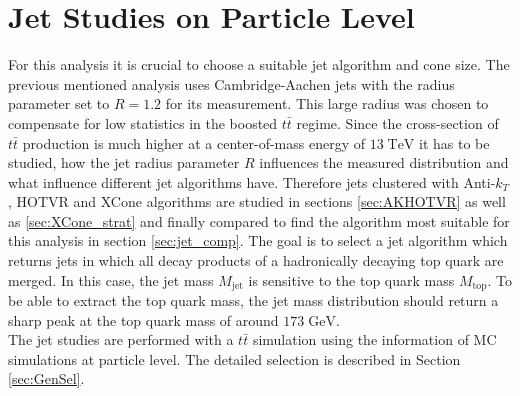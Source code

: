 \section{Jet Studies on Particle Level}
\label{sec:jet_studies}
	For this analysis it is crucial to choose a suitable jet algorithm and cone size. The previous mentioned analysis \cite{torben_paper} uses Cambridge-Aachen jets with the radius parameter set to $R=1.2$ for its measurement. This large radius was chosen to compensate for low statistics in the boosted $t\bar{t}$ regime. Since the cross-section of $t\bar{t}$ production is much higher at a center-of-mass energy of $13\;\text{TeV}$ it has to be studied, how the jet radius parameter $R$ influences the measured distribution and what influence different jet algorithms have. Therefore jets clustered with Anti-$k_T$, HOTVR and XCone algorithms are studied in sections \ref{sec:AKHOTVR} as well as \ref{sec:XCone_strat} and finally compared to find the algorithm most suitable for this analysis in section \ref{sec:jet_comp}. The goal is to select a jet algorithm which returns jets in which all decay products of a hadronically decaying top quark are merged. In this case, the jet mass $M_\text{jet}$ is sensitive to the top quark mass $M_\text{top}$. To be able to extract the top quark mass, the jet mass distribution should return a sharp peak at the top quark mass of around $173\;\text{GeV}$.
	\\
	The jet studies are performed with a $t\bar{t}$ simulation using the information of MC simulations at particle level. The detailed selection is described in Section \ref{sec:GenSel}.

